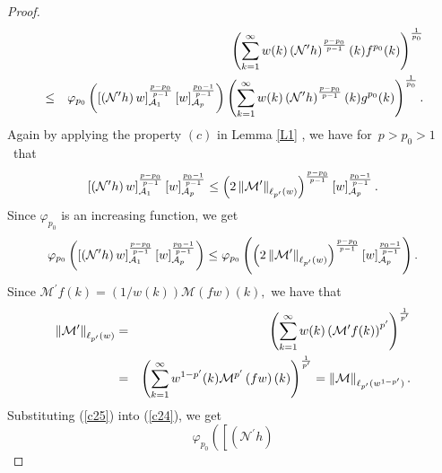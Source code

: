 \documentclass[a4paper]{amsart}
\theoremstyle{plain}
\numberwithin{equation}{section}
\begin{document}
\begin{proof}
\begin{eqnarray}
&&\left( \sum_{k=1}^{\infty }w(k)\left( \mathcal{N}^{\prime }h\right) ^{%
\frac{p-p_{0}}{p-1}}(k)f^{p_{0}}(k)\right) ^{\frac{1}{p_{0}}}  \notag \\
&\leq &\mathcal{\varphi }_{p_{0}}\left( \left[ \left( \mathcal{N}^{\prime
}h\right) w\right] _{\mathcal{A}_{1}}^{\frac{p-p_{0}}{p-1}}\left[ w\right] _{%
\mathcal{A}_{p}}^{\frac{p_{0}-1}{p-1}}\right) \left( \sum_{k=1}^{\infty
}w(k)\left( \mathcal{N}^{\prime }h\right) ^{\frac{p-p_{0}}{p-1}%
}(k)g^{p_{0}}(k)\right) ^{\frac{1}{p_{0}}}.  \label{c23}
\end{eqnarray}%
Again by applying the property $(c)$ in Lemma \ref{L1} , we have for\ $%
p>p_{0}>1$\ that\ 
\begin{equation*}
\left[ \left( \mathcal{N}^{\prime }h\right) w\right] _{\mathcal{A}_{1}}^{%
\frac{p-p_{0}}{p-1}}\left[ w\right] _{\mathcal{A}_{p}}^{\frac{p_{0}-1}{p-1}%
}\leq \left( 2\left\Vert \mathcal{M}^{\prime }\right\Vert _{\ell _{p^{\prime
}}(w)}\right) ^{\frac{p-p_{0}}{p-1}}\left[ w\right] _{\mathcal{A}_{p}}^{%
\frac{p_{0}-1}{p-1}}.
\end{equation*}%
Since $\mathcal{\varphi }_{p_{0}}$ is an increasing function, we get%
\begin{equation}
\mathcal{\varphi }_{p_{0}}\left( \left[ \left( \mathcal{N}^{\prime }h\right)
w\right] _{\mathcal{A}_{1}}^{\frac{p-p_{0}}{p-1}}\left[ w\right] _{\mathcal{A%
}_{p}}^{\frac{p_{0}-1}{p-1}}\right) \leq \mathcal{\varphi }_{p_{0}}\left(
\left( 2\left\Vert \mathcal{M}^{\prime }\right\Vert _{\ell _{p^{\prime
}}(w)}\right) ^{\frac{p-p_{0}}{p-1}}\left[ w\right] _{\mathcal{A}_{p}}^{%
\frac{p_{0}-1}{p-1}}\right) .  \label{c24}
\end{equation}%
Since $\mathcal{M}^{\prime }f(k)=\left( 1/w(k)\right) \mathcal{M}\left(
fw\right) (k),$ we have that%
\begin{eqnarray}
\left\Vert \mathcal{M}^{\prime }\right\Vert _{\ell _{p^{\prime }}(w)}
&=&\left( \sum_{k=1}^{\infty }w(k)\left( \mathcal{M}^{\prime }f(k)\right)
^{p^{\prime }}\right) ^{\frac{1}{p^{\prime }}}  \notag \\
&=&\left( \sum_{k=1}^{\infty }w^{1-p^{\prime }}(k)\mathcal{M}^{p^{\prime
}}\left( fw\right) (k)\right) ^{\frac{1}{p^{\prime }}}=\left\Vert \mathcal{M}%
\right\Vert _{\ell _{p^{\prime }}(w^{1-p^{\prime }})}.  \label{c25}
\end{eqnarray}%
Substituting (\ref{c25}) into (\ref{c24}), we get%
\begin{equation*}
\mathcal{\varphi }_{p_{0}}\left( \left[ \left( \mathcal{N}^{\prime }h\right)

\end{equation*}
\end{proof}
\end{document}
